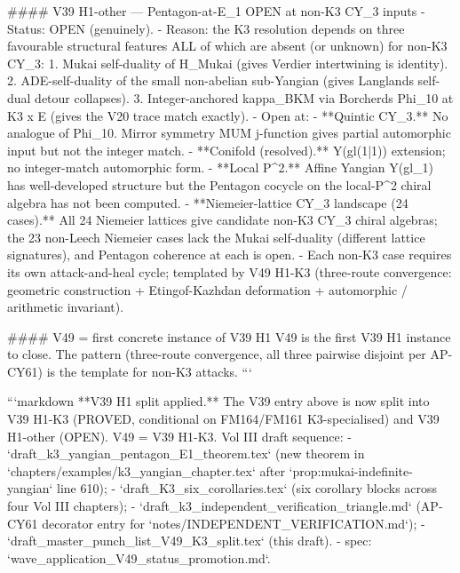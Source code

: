 #### V39 H1-other --- Pentagon-at-E_1 OPEN at non-K3 CY_3 inputs
- Status: OPEN (genuinely).
- Reason: the K3 resolution depends on three favourable structural features ALL of which are absent (or unknown) for non-K3 CY_3:
  1. Mukai self-duality of H_{Mukai} (gives Verdier intertwining is identity).
  2. ADE-self-duality of the small non-abelian sub-Yangian (gives Langlands self-dual detour collapses).
  3. Integer-anchored kappa_BKM via Borcherds Phi_10 at K3 x E (gives the V20 trace match exactly).
- Open at:
  - **Quintic CY_3.** No analogue of Phi_10. Mirror symmetry MUM j-function gives partial automorphic input but not the integer match.
  - **Conifold (resolved).** Y(gl(1|1)) extension; no integer-match automorphic form.
  - **Local P^2.** Affine Yangian Y(gl_1) has well-developed structure but the Pentagon cocycle on the local-P^2 chiral algebra has not been computed.
  - **Niemeier-lattice CY_3 landscape (24 cases).** All 24 Niemeier lattices give candidate non-K3 CY_3 chiral algebras; the 23 non-Leech Niemeier cases lack the Mukai self-duality (different lattice signatures), and Pentagon coherence at each is open.
- Each non-K3 case requires its own attack-and-heal cycle; templated by V49 H1-K3 (three-route convergence: geometric construction + Etingof-Kazhdan deformation + automorphic / arithmetic invariant).

#### V49 = first concrete instance of V39 H1
V49 is the first V39 H1 instance to close. The pattern (three-route convergence, all three pairwise disjoint per AP-CY61) is the template for non-K3 attacks.
```



```markdown
**V39 H1 split applied.** The V39 entry above is now split into V39 H1-K3 (PROVED, conditional on FM164/FM161 K3-specialised) and V39 H1-other (OPEN). V49 = V39 H1-K3. Vol III draft sequence:
- `draft_k3_yangian_pentagon_E1_theorem.tex` (new theorem in `chapters/examples/k3_yangian_chapter.tex` after `prop:mukai-indefinite-yangian` line 610);
- `draft_K3_six_corollaries.tex` (six corollary blocks across four Vol III chapters);
- `draft_k3_independent_verification_triangle.md` (AP-CY61 decorator entry for `notes/INDEPENDENT_VERIFICATION.md`);
- `draft_master_punch_list_V49_K3_split.tex` (this draft).
- spec: `wave_application_V49_status_promotion.md`.

